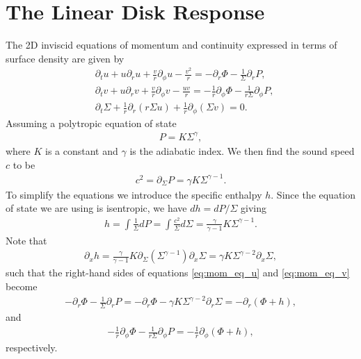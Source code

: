 \section{The Linear Disk Response}


The 2D inviscid equations of momentum and continuity expressed in terms of surface density are given by 
\begin{align}
    &\partial_t u + u \partial_r u + \frac{v}{r} \partial_\phi u - \frac{v^2}{r} = - \partial_r \Phi - \frac{1}{\Sigma} \partial_r P, \label{eq:mom_eq_u} \\ 
    &\partial_t v + u \partial_r v + \frac{v}{r} \partial_\phi v - \frac{uv}{r} = - \frac{1}{r} \partial_\phi \Phi - \frac{1}{r\Sigma} \partial_\phi P, \label{eq:mom_eq_v} \\
    &\partial_t \Sigma + \frac{1}{r} \partial_r (r \Sigma u) + \frac{1}{r} \partial_\phi (\Sigma v) = 0. 
    \label{eq:cont_2d}
\end{align}
Assuming a polytropic equation of state
\begin{align}
    P = K \Sigma^\gamma,
\end{align}
where $K$ is a constant and $\gamma$ is the adiabatic index. We then find the sound speed $c$ to be
\begin{align}
    c^2 = \partial_\Sigma P = \gamma K \Sigma^{\gamma-1}. \label{eq:cs_poly}
\end{align}
To simplify the equations we introduce the specific enthalpy $h$. Since the equation of state we are using is isentropic, we have $dh = dP / \Sigma$ giving
\begin{align}
    h = \int \frac{1}{\Sigma} dP = \int \frac{c^2}{\Sigma} d\Sigma = \frac{\gamma}{\gamma-1} K \Sigma^{\gamma-1}. \label{eq:enthalpy}
\end{align}
Note that
\begin{align}
    \partial_x h = \frac{\gamma}{\gamma - 1} K \partial_\Sigma (\Sigma^{\gamma-1}) \partial_x \Sigma = \gamma K \Sigma^{\gamma-2} \partial_x \Sigma,
\end{align}
such that the right-hand sides of equations \ref{eq:mom_eq_u} and \ref{eq:mom_eq_v} become
\begin{align}
    - \partial_r \Phi - \frac{1}{\Sigma} \partial_r P = - \partial_r \Phi - \gamma K \Sigma^{\gamma-2} \partial_r \Sigma = - \partial_r (\Phi + h) \label{eq:mom_u_RHS},
\end{align}
and
\begin{align}
    - \frac{1}{r} \partial_\phi \Phi - \frac{1}{r\Sigma} \partial_\phi P = - \frac{1}{r} \partial_\phi (\Phi + h) \label{eq:mom_v_RHS},
\end{align}
respectively.


